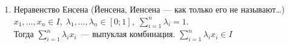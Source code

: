 \documentclass[a4paper,12pt]{article}
\newcommand\R{\mathbb{R}}
\newcommand\convex{\,\underline\cup\,}
\theoremstyle{plain}
\newtheorem{lem}{Лемма}
\theoremstyle{definition}
\theoremstyle{remark}
\def\resetdefs{ \setcounter{defn}{0}\setcounter{exmp}{0} }
\def\resetthrm{ \setcounter{thrm}{0}\setcounter{stat}{0} }
\def\resetrem{ \setcounter{rem}{0} }
\def\resetall{ \resetdefs \resetthrm \resetrem}
\begin{document}
\begin{enumerate}
    \begin{lem}[О 3 хордах]
      Пусть $f : I \to \R,\; f \convex I,\; x_1, x,x_2\in I: x_1 < x < x_2$.
      Тогда и только тогда: 
      $$
        {f(x)-f(x_1)\over x-x_1} \leq {f(x_2)-f(x_1)\over x_2-x_1} \leq {f(x_2)-f(x)\over x_2-x} 
      $$
    \end{lem} Давайте объявим её очевидной из геометрии. 
    ( На самом деле она спокойно докажется из определения, но это длинно и не шибко интересно )
  \item Неравенство Енсена (Йенсена, Иенсена --- как только его не называют\dots)
    \resetall
    {  $x_1,\ldots,x_n\in I, \; \lambda_1,\ldots,\lambda_n\in[0;1],\;
      \sum\limits_{i=1}^n\lambda_i = 1$. \\
      Тогда $\displaystyle \sum_{i=1}^n\lambda_ix_i$~--- выпуклая комбинация.
    }
    { \rem $\sum\limits_{i=1}^n\lambda_ix_i \in I$ } 


\end{enumerate}
\end{document}
